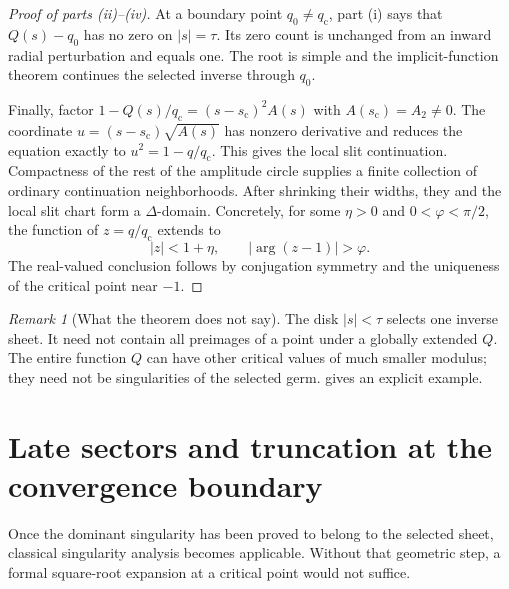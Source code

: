 \documentclass[11pt,a4paper]{article}
\numberwithin{equation}{section}
\theoremstyle{definition}
\theoremstyle{remark}
\newtheorem{remark}[remark]{Remark}
\newcommand{\scv}{s_{\mathrm c}}
\newcommand{\qcv}{q_{\mathrm c}}
\begin{document}
\begin{proof}[Proof of parts (ii)--(iv)]
At a boundary point $q_0\neq\qcv$, part (i) says that $Q(s)-q_0$ has no zero on $|s|=\tau$. Its zero count is unchanged from an inward radial perturbation and equals one. The root is simple and the implicit-function theorem continues the selected inverse through $q_0$.

Finally, factor $1-Q(s)/\qcv=(s-\scv)^2A(s)$ with $A(\scv)=A_2\neq0$. The coordinate $u=(s-\scv)\sqrt{A(s)}$ has nonzero derivative and reduces the equation exactly to $u^2=1-q/\qcv$. This gives the local slit continuation. Compactness of the rest of the amplitude circle supplies a finite collection of ordinary continuation neighborhoods. After shrinking their widths, they and the local slit chart form a $\Delta$-domain. Concretely, for some $\eta>0$ and $0<\varphi<\pi/2$, the function of $z=q/\qcv$ extends to
\[
 |z|<1+\eta,\qquad |\arg(z-1)|>\varphi.
\]
The real-valued conclusion follows by conjugation symmetry and the uniqueness of the critical point near $-1$.
\end{proof}

\begin{remark}[What the theorem does not say]
The disk $|s|<\tau$ selects one inverse sheet. It need not contain all preimages of a point under a globally extended $Q$. The entire function $Q$ can have other critical values of much smaller modulus; they need not be singularities of the selected germ.  gives an explicit example.
\end{remark}

\section{Late sectors and truncation at the convergence boundary}
\label{sec:late}
Once the dominant singularity has been proved to belong to the selected sheet, classical singularity analysis becomes applicable. Without that geometric step, a formal square-root expansion at a critical point would not suffice.
\end{document}

